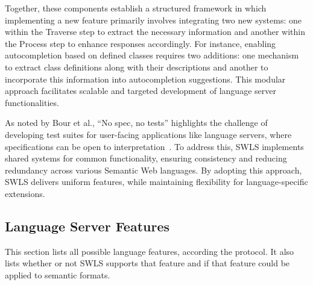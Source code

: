 Together, these components establish a structured framework in which implementing a new feature primarily involves integrating two new systems: one within the Traverse step to extract the necessary information and another within the Process step to enhance responses accordingly.
For instance, enabling autocompletion based on defined classes requires two additions: one mechanism to extract class definitions along with their descriptions and another to incorporate this information into autocompletion suggestions. 
This modular approach facilitates scalable and targeted development of language server functionalities.

As noted by Bour et al., ``No spec, no tests'' highlights the challenge of developing test suites for user-facing applications like language servers, where specifications can be open to interpretation~\cite{Bour_2018}. 
To address this, SWLS implements shared systems for common functionality, ensuring consistency and reducing redundancy across various Semantic Web languages.
By adopting this approach, SWLS delivers uniform features, while maintaining flexibility for language-specific extensions.



\subsection{Language Server Features}

This section lists all possible language features, according the protocol.
It also lists whether or not SWLS supports that feature and if that feature could be applied to semantic formats.

